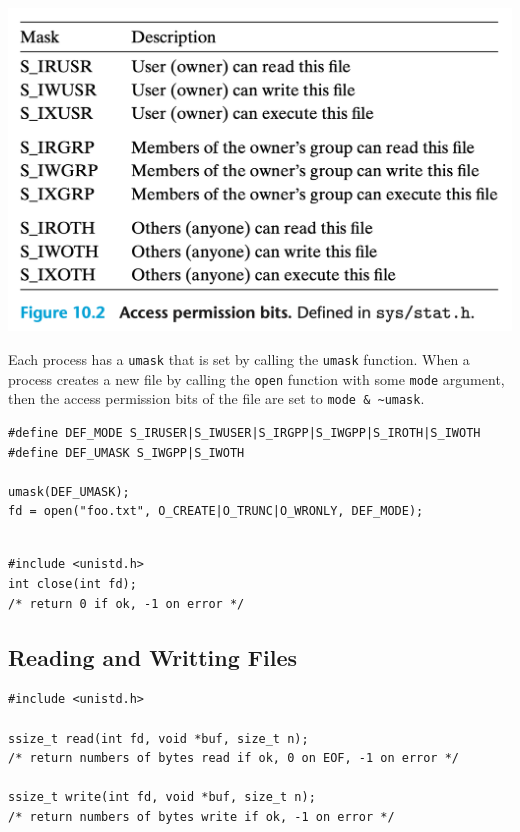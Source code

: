 \documentclass[11pt]{article}
\begin{document}
\begin{center}
\includegraphics[width=.9\linewidth]{pics/figure10.2-permission-bits.png}
\end{center}


Each process has a \texttt{umask} that is set by calling the \texttt{umask} function. When a process creates a new file by calling the \texttt{open} function with some \texttt{mode} argument, then the access permission bits of the file are set to \texttt{mode \& \textasciitilde{}umask}.\\

\begin{verbatim}
#define DEF_MODE S_IRUSER|S_IWUSER|S_IRGPP|S_IWGPP|S_IROTH|S_IWOTH
#define DEF_UMASK S_IWGPP|S_IWOTH

umask(DEF_UMASK);
fd = open("foo.txt", O_CREATE|O_TRUNC|O_WRONLY, DEF_MODE);

\end{verbatim}


\begin{verbatim}

#include <unistd.h>
int close(int fd);
/* return 0 if ok, -1 on error */

\end{verbatim}

\subsection{Reading and Writting Files}
\label{sec:orga871843}

\begin{verbatim}
#include <unistd.h>

ssize_t read(int fd, void *buf, size_t n);
/* return numbers of bytes read if ok, 0 on EOF, -1 on error */

ssize_t write(int fd, void *buf, size_t n);
/* return numbers of bytes write if ok, -1 on error */



\end{verbatim}
\end{document}
